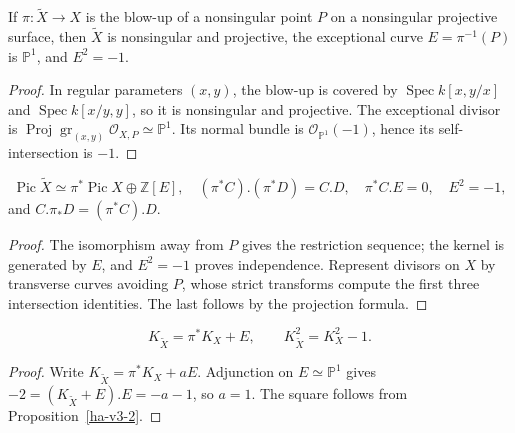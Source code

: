 \begin{proposition}
\label{ha-v3-1}
If \(\pi:\widetilde X\to X\) is the blow-up of a nonsingular point \(P\) on a
nonsingular projective surface, then \(\widetilde X\) is nonsingular and
projective, the exceptional curve \(E=\pi^{-1}(P)\) is \(\mathbb P^1\), and
\(E^2=-1\).

\end{proposition}
\begin{proof}
In regular parameters \((x,y)\), the blow-up is covered by
\(\operatorname{Spec}k[x,y/x]\) and \(\operatorname{Spec}k[x/y,y]\), so it is
nonsingular and projective.  The exceptional divisor is \(\operatorname{Proj}
\operatorname{gr}_{(x,y)}\mathcal O_{X,P}\simeq\mathbb P^1\).  Its normal bundle
is \(\mathcal O_{\mathbb P^1}(-1)\), hence its self-intersection is \(-1\).
\end{proof}

\begin{proposition}
\label{ha-v3-2}
\[
 \operatorname{Pic}\widetilde X\simeq\pi^*\operatorname{Pic}X\oplus\mathbb Z[E],
 \quad (\pi^*C).(\pi^*D)=C.D,\quad \pi^*C.E=0,\quad E^2=-1,
\]
and \(C.\pi_*D=(\pi^*C).D\).

\end{proposition}
\begin{proof}
The isomorphism away from \(P\) gives the restriction sequence; the kernel is
generated by \(E\), and \(E^2=-1\) proves independence.  Represent divisors on
\(X\) by transverse curves avoiding \(P\), whose strict transforms compute the
first three intersection identities.  The last follows by the projection
formula.
\end{proof}

\begin{proposition}
\label{ha-v3-3}
\[
 K_{\widetilde X}=\pi^*K_X+E,\qquad K_{\widetilde X}^2=K_X^2-1.
\]
\end{proposition}
\begin{proof}
Write \(K_{\widetilde X}=\pi^*K_X+aE\).  Adjunction on
\(E\simeq\mathbb P^1\) gives \(-2=(K_{\widetilde X}+E).E=-a-1\), so \(a=1\).
The square follows from Proposition~\ref{ha-v3-2}.
\end{proof}

